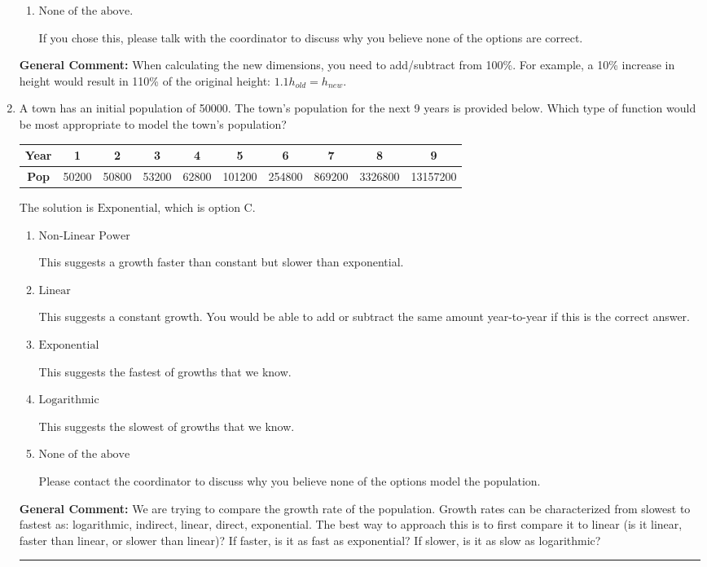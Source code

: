 \documentclass{extbook}[14pt]
\newcommand{\litem}[1]{\item #1

\rule{\textwidth}{0.4pt}}
\begin{document}
\begin{enumerate}
{\begin{enumerate}[label=\Alph*.]
This corresponds to the model: $V = (0.89 r)^2 (0.85 h)$.
\item \( \text{None of the above.} \)

If you chose this, please talk with the coordinator to discuss why you believe none of the options are correct.
\end{enumerate}

\textbf{General Comment:} When calculating the new dimensions, you need to add/subtract from 100\%. For example, a 10\% increase in height would result in 110\% of the original height: $1.1h_{old} = h_{new}$.
}
\litem{
A town has an initial population of 50000. The town's population for the next 9 years is provided below. Which type of function would be most appropriate to model the town's population?


\begin{tabular}{c|c|c|c|c|c|c|c|c|c}
\textbf{Year} &1 &2 &3 &4 &5 &6 &7 &8 &9\tabularnewline \hline
\textbf{Pop} &50200 &50800 &53200 &62800 &101200 &254800 &869200 &3326800 &13157200\end{tabular}The solution is \( \text{Exponential} \), which is option C.\begin{enumerate}[label=\Alph*.]
\item \( \text{Non-Linear Power} \)

This suggests a growth faster than constant but slower than exponential.
\item \( \text{Linear} \)

This suggests a constant growth. You would be able to add or subtract the same amount year-to-year if this is the correct answer.
\item \( \text{Exponential} \)

This suggests the fastest of growths that we know.
\item \( \text{Logarithmic} \)

This suggests the slowest of growths that we know.
\item \( \text{None of the above} \)

Please contact the coordinator to discuss why you believe none of the options model the population.
\end{enumerate}

\textbf{General Comment:} We are trying to compare the growth rate of the population. Growth rates can be characterized from slowest to fastest as: logarithmic, indirect, linear, direct, exponential. The best way to approach this is to first compare it to linear (is it linear, faster than linear, or slower than linear)? If faster, is it as fast as exponential? If slower, is it as slow as logarithmic?
}
\end{enumerate}
\end{document}
